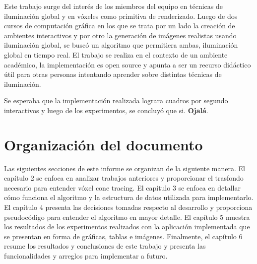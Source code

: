 Este trabajo surge del interés de los miembros del equipo en técnicas de iluminación global y en vóxeles como primitiva de renderizado.
Luego de dos cursos de computación gráfica en los que se trata por un lado la creación de ambientes interactivos y por otro la generación de imágenes realistas usando iluminación global, se buscó un algoritmo que permitiera ambas, iluminación global en tiempo real.
El trabajo se realiza en el contexto de un ambiente académico, la implementación es open source y apunta a ser un recurso didáctico útil para otras personas intentando aprender sobre distintas técnicas de iluminación.

Se esperaba que la implementación realizada lograra cuadros por segundo interactivos y luego de los experimentos, se concluyó que si. \textbf{Ojalá}.

\section{Organización del documento}

Las siguientes secciones de este informe se organizan de la siguiente manera.
El capítulo 2 se enfoca en analizar trabajos anteriores y proporcionar el trasfondo necesario para entender vóxel cone tracing.
El capítulo 3 se enfoca en detallar cómo funciona el algoritmo y la estructura de datos utilizada para implementarlo.
El capítulo 4 presenta las decisiones tomadas respecto al desarrollo y proporciona pseudocódigo para entender el algoritmo en mayor detalle.
El capítulo 5 muestra los resultados de los experimentos realizados con la aplicación implementada que se presentan en forma de gráficas, tablas e imágenes.
Finalmente, el capítulo 6 resume los resultados y conclusiones de este trabajo y presenta las funcionalidades y arreglos para implementar a futuro.
